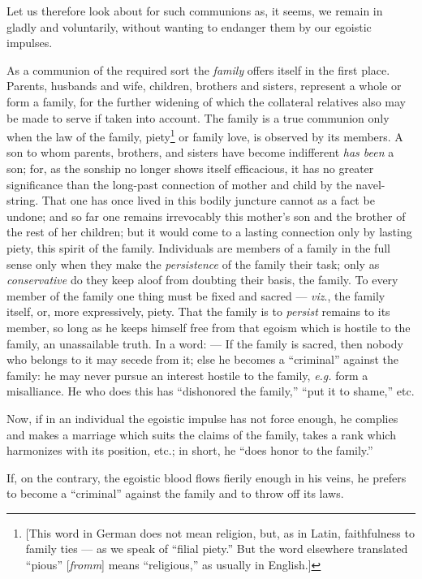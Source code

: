 Let us therefore look about for such communions as, it seems, we remain in 
gladly and voluntarily, without wanting to endanger them by our egoistic 
impulses.

As a communion of the required sort the \textit{family} offers itself in the 
first place. Parents, husbands and wife, children, brothers and sisters, 
represent a whole or form a family, for the further widening of which the 
collateral relatives also may be made to serve if taken into account. The 
family is a true communion only when the law of the family, 
piety\footnote{[This word in German does not mean religion, but, as in Latin, 
faithfulness to family ties --- as we speak of ``filial piety.'' But the word 
elsewhere translated ``pious'' [\textit{fromm}] means ``religious,'' as 
usually in English.]} or family love, is observed by its members. A son to 
whom parents, brothers, and sisters have become indifferent \textit{has been} 
a son; for, as the sonship no longer shows itself efficacious, it has no 
greater significance than the long-past connection of mother and child by the 
navel-string. That one has once lived in this bodily juncture cannot as a fact 
be undone; and so far one remains irrevocably this mother's son and the 
brother of the rest of her children; but it would come to a lasting connection 
only by lasting piety, this spirit of the family. Individuals are members of a 
family in the full sense only when they make the \textit{persistence} of the 
family their task; only as \textit{conservative} do they keep aloof from 
doubting their basis, the family. To every member of the family one thing must 
be fixed and sacred --- \textit{viz}., the family itself, or, more 
expressively, piety. That the family is to \textit{persist} remains to its 
member, so long as he keeps himself free from that egoism which is hostile to 
the family, an unassailable truth. In a word: --- If the family is sacred, then 
nobody who belongs to it may secede from it; else he becomes a ``criminal'' 
against the family: he may never pursue an interest hostile to the family, 
\textit{e.g.} form a misalliance. He who does this has ``dishonored the 
family,'' ``put it to shame,'' etc.

Now, if in an individual the egoistic impulse has not force enough, he 
complies and makes a marriage which suits the claims of the family, takes a 
rank which harmonizes with its position, etc.; in short, he ``does honor to 
the family.''

If, on the contrary, the egoistic blood flows fierily enough in his veins, he 
prefers to become a ``criminal'' against the family and to throw off its 
laws.


